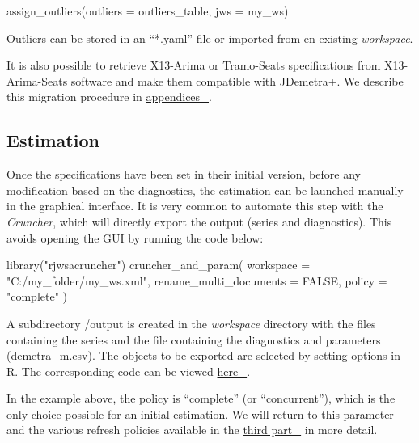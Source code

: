 \documentclass[
  letterpaper,
  DIV=11,
  numbers=noendperiod]{scrreprt}
\newenvironment{Shaded}{\begin{snugshade}}{\end{snugshade}}
\newcommand{\AttributeTok}[1]{\textcolor[rgb]{0.40,0.45,0.13}{#1}}
\newcommand{\ConstantTok}[1]{\textcolor[rgb]{0.56,0.35,0.01}{#1}}
\newcommand{\FunctionTok}[1]{\textcolor[rgb]{0.28,0.35,0.67}{#1}}
\newcommand{\NormalTok}[1]{\textcolor[rgb]{0.00,0.23,0.31}{#1}}
\newcommand{\StringTok}[1]{\textcolor[rgb]{0.13,0.47,0.30}{#1}}
\begin{document}
\begin{Shaded}
\begin{Highlighting}[]
\FunctionTok{assign\_outliers}\NormalTok{(}\AttributeTok{outliers =}\NormalTok{ outliers\_table, }\AttributeTok{jws =}\NormalTok{ my\_ws)}
\end{Highlighting}
\end{Shaded}

Outliers can be stored in an ``*.yaml'' file or imported from en
existing \emph{workspace}.

It is also possible to retrieve X13-Arima or Tramo-Seats specifications
from X13-Arima-Seats software and make them compatible with JDemetra+.
We describe this migration procedure in
\protect\hyperlink{mig-to-jd}{appendices~🔗}.

\hypertarget{estimation}{%
\subsection*{Estimation}\label{estimation}}

Once the specifications have been set in their initial version, before
any modification based on the diagnostics, the estimation can be
launched manually in the graphical interface. It is very common to
automate this step with the \emph{Cruncher}, which will directly export
the output (series and diagnostics). This avoids opening the GUI by
running the code below:

\begin{Shaded}
\begin{Highlighting}[]
\FunctionTok{library}\NormalTok{(}\StringTok{"rjwsacruncher"}\NormalTok{)}
\FunctionTok{cruncher\_and\_param}\NormalTok{(}
    \AttributeTok{workspace =} \StringTok{"C:/my\_folder/my\_ws.xml"}\NormalTok{,}
    \AttributeTok{rename\_multi\_documents =} \ConstantTok{FALSE}\NormalTok{,}
    \AttributeTok{policy =} \StringTok{"complete"}
\NormalTok{)}
\end{Highlighting}
\end{Shaded}

A subdirectory /output is created in the \emph{workspace} directory with
the files containing the series and the file containing the diagnostics
and parameters (demetra\_m.csv). The objects to be exported are selected
by setting options in R. The corresponding code can be viewed
\href{https://doc.jdemetra.org/t-production-tools-Cruncher-qr}{here~🔗}.

In the example above, the policy is ``complete'' (or ``concurrent''),
which is the only choice possible for an initial estimation. We will
return to this parameter and the various refresh policies available in
the \protect\hyperlink{camp-infra}{third part~🔗} in more detail.
\end{document}
